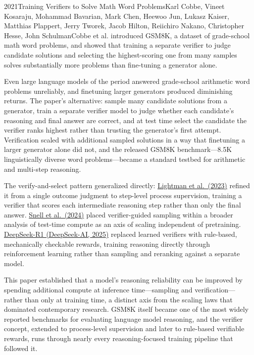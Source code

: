 
\begin{papersummary}{2021}{Training Verifiers to Solve Math Word Problems}{Karl Cobbe, Vineet Kosaraju, Mohammad Bavarian, Mark Chen, Heewoo Jun, Lukasz Kaiser, Matthias Plappert, Jerry Tworek, Jacob Hilton, Reiichiro Nakano, Christopher Hesse, John Schulman}{Cobbe et al. introduced GSM8K, a dataset of grade-school math word problems, and showed that training a separate verifier to judge candidate solutions and selecting the highest-scoring one from many samples solves substantially more problems than fine-tuning a generator alone.}

Even large language models of the period answered grade-school arithmetic word problems unreliably, and finetuning larger generators produced diminishing returns. The paper's alternative: sample many candidate solutions from a generator, train a separate verifier model to judge whether each candidate's reasoning and final answer are correct, and at test time select the candidate the verifier ranks highest rather than trusting the generator's first attempt. Verification scaled with additional sampled solutions in a way that finetuning a larger generator alone did not, and the released GSM8K benchmark---8.5K linguistically diverse word problems---became a standard testbed for arithmetic and multi-step reasoning.

The verify-and-select pattern generalized directly: \hyperref[paper:lightman-2023-verify]{Lightman et al.\ (2023)} refined it from a single outcome judgment to step-level process supervision, training a verifier that scores each intermediate reasoning step rather than only the final answer. \hyperref[paper:snell-2024-test-time]{Snell et al.\ (2024)} placed verifier-guided sampling within a broader analysis of test-time compute as an axis of scaling independent of pretraining. \hyperref[paper:deepseek-2025-r1]{DeepSeek-R1 (DeepSeek-AI, 2025)} replaced learned verifiers with rule-based, mechanically checkable rewards, training reasoning directly through reinforcement learning rather than sampling and reranking against a separate model.

This paper established that a model's reasoning reliability can be improved by spending additional compute at inference time---sampling and verification---rather than only at training time, a distinct axis from the scaling laws that dominated contemporary research. GSM8K itself became one of the most widely reported benchmarks for evaluating language model reasoning, and the verifier concept, extended to process-level supervision and later to rule-based verifiable rewards, runs through nearly every reasoning-focused training pipeline that followed it.

\end{papersummary}

